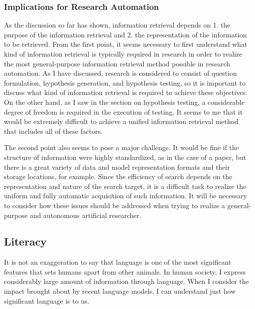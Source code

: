 \documentclass{article}
\begin{document}
\subsubsection{Implications for Research Automation}
As the discussion so far has shown, information retrieval depends on 1. the purpose of the information retrieval and 2. the representation of the information to be retrieved. From the first point, it seems necessary to first understand what kind of information retrieval is typically required in research in order to realize the most general-purpose information retrieval method possible in research automation. As I have discussed, research is considered to consist of question formulation, hypothesis generation, and hypothesis testing, so it is important to discuss what kind of information retrieval is required to achieve these objectives. On the other hand, as I saw in the section on hypothesis testing, a considerable degree of freedom is required in the execution of testing. It seems to me that it would be extremely difficult to achieve a unified information retrieval method that includes all of these factors.

The second point also seems to pose a major challenge. It would be fine if the structure of information were highly standardized, as in the case of a paper, but there is a great variety of data and model representation formats and their storage locations, for example. Since the efficiency of search depends on the representation and nature of the search target, it is a difficult task to realize the uniform and fully automatic acquisition of such information. It will be necessary to consider how these issues should be addressed when trying to realize a general-purpose and autonomous artificial researcher.



\subsection{Literacy}

It is not an exaggeration to say that language is one of the most significant features that sets humans apart from other animals. In human society, I express considerably large amount of information through language. When I consider the impact brought about by recent language models, I can understand just how significant language is to us.
\end{document}
